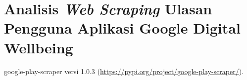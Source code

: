\chapter{Analisis \textit{Web Scraping} Ulasan Pengguna Aplikasi Google Digital Wellbeing}
\label{chpt:web_scraping}

google-play-scraper versi 1.0.3 (\url{https://pypi.org/project/google-play-scraper/}).
